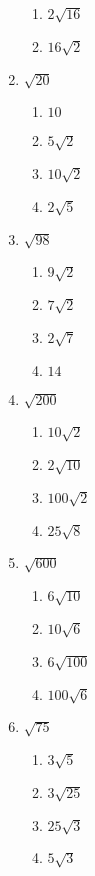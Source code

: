 \documentclass{hw}
\begin{document}
\begin{enumerate}[label=\alph*.]
\begin{enumerate}[label=\Alph*.]
            \item $2\sqrt{16}$
            \item $16\sqrt{2}$
        \end{enumerate}
        \studentworkspace
    \item $\sqrt{20}$
        \begin{enumerate}[label=\Alph*.]
            \item $10$
            \item $5\sqrt{2}$
            \item $10\sqrt{2}$
            \item $2\sqrt{5}$
        \end{enumerate}
        \studentworkspace
    \item $\sqrt{98}$
        \begin{enumerate}[label=\Alph*.]
            \item $9\sqrt{2}$
            \item $7\sqrt{2}$
            \item $2\sqrt{7}$
            \item $14$
        \end{enumerate}
        \studentworkspace
    \item $\sqrt{200}$
        \begin{enumerate}[label=\Alph*.]
            \item $10\sqrt{2}$
            \item $2\sqrt{10}$
            \item $100\sqrt{2}$
            \item $25\sqrt{8}$
        \end{enumerate}
        \studentworkspace
    \item $\sqrt{600}$
        \begin{enumerate}[label=\Alph*.]
            \item $6\sqrt{10}$
            \item $10\sqrt{6}$
            \item $6\sqrt{100}$
            \item $100\sqrt{6}$
        \end{enumerate}
        \studentworkspace
    \item $\sqrt{75}$
        \begin{enumerate}[label=\Alph*.]
            \item $3\sqrt{5}$
            \item $3\sqrt{25}$
            \item $25\sqrt{3}$
            \item $5\sqrt{3}$
        \end{enumerate}
        \studentworkspace

\end{enumerate}
\end{document}
